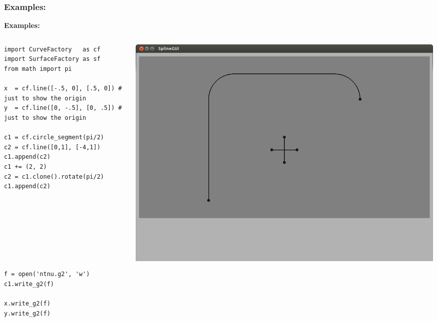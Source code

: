 \documentclass{beamer}
\theoremstyle{plain}
\theoremstyle{definition}
\begin{document}
\begin{frame}[fragile]
\frametitle{Examples:}
\textbf{Examples:}
\begin{columns}
    \begin{column}{.50\linewidth}
        \begin{listing}[H]
            \tiny
            \begin{verbatim}
import CurveFactory   as cf
import SurfaceFactory as sf
from math import pi

x  = cf.line([-.5, 0], [.5, 0]) # just to show the origin
y  = cf.line([0, -.5], [0, .5]) # just to show the origin

c1 = cf.circle_segment(pi/2)
c2 = cf.line([0,1], [-4,1])
c1.append(c2)
c1 += (2, 2)
c2 = c1.clone().rotate(pi/2)
c1.append(c2)








f = open('ntnu.g2', 'w')
c1.write_g2(f)

x.write_g2(f)
y.write_g2(f)
            \end{verbatim}
        \end{listing}
    \end{column}
    \begin{column}{.45\linewidth}
        \includegraphics[width=\linewidth]{ntnu2}
    \end{column}
\end{columns}

\end{frame}

\end{document}

